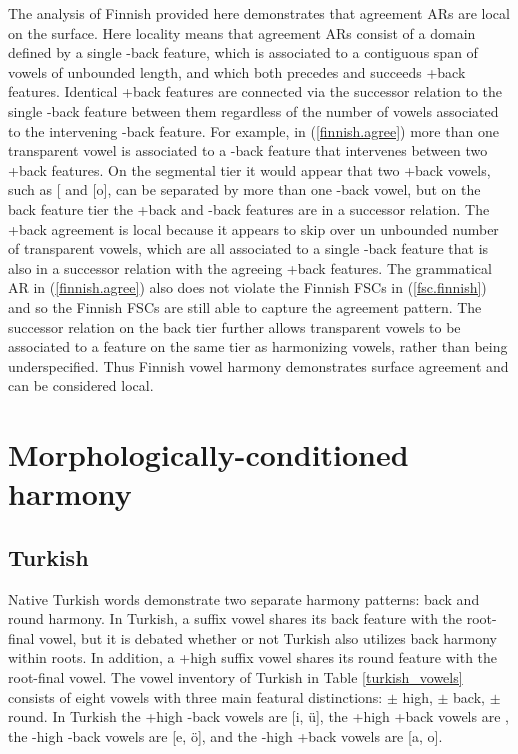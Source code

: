 \documentclass[,doc,floatsintext]{apa6}
\theoremstyle{definition}
\theoremstyle{definition}
\theoremstyle{definition}
\theoremstyle{remark}
\begin{document}
The analysis of Finnish provided here demonstrates that agreement ARs
are local on the surface. Here locality means that agreement ARs consist
of a domain defined by a single -back feature, which is associated to a
contiguous span of vowels of unbounded length, and which both precedes
and succeeds +back features. Identical +back features are connected via
the successor relation to the single -back feature between them
regardless of the number of vowels associated to the intervening -back
feature. For example, in (\ref{finnish.agree}) more than one transparent
vowel is associated to a -back feature that intervenes between two +back
features. On the segmental tier it would appear that two +back vowels,
such as {[}\textipa{A}{]} and {[}o{]}, can be separated by more than one
-back vowel, but on the back feature tier the +back and -back features
are in a successor relation. The +back agreement is local because it
appears to skip over un unbounded number of transparent vowels, which
are all associated to a single -back feature that is also in a successor
relation with the agreeing +back features. The grammatical AR in
(\ref{finnish.agree}) also does not violate the Finnish FSCs in
(\ref{fsc.finnish}) and so the Finnish FSCs are still able to capture
the agreement pattern. The successor relation on the back tier further
allows transparent vowels to be associated to a feature on the same tier
as harmonizing vowels, rather than being underspecified. Thus Finnish
vowel harmony demonstrates surface agreement and can be considered
local.

\section{Morphologically-conditioned
harmony}\label{morphologically-conditioned-harmony}

\subsection{Turkish}\label{turkish}

Native Turkish words demonstrate two separate harmony patterns: back and
round harmony. In Turkish, a suffix vowel shares its back feature with
the root-final vowel, but it is debated whether or not Turkish also
utilizes back harmony within roots. In addition, a +high suffix vowel
shares its round feature with the root-final vowel. The vowel inventory
of Turkish in Table \ref{turkish_vowels} consists of eight vowels with
three main featural distinctions: \(\pm\) high, \(\pm\) back, \(\pm\)
round. In Turkish the +high -back vowels are {[}i, ü{]}, the +high +back
vowels are \textipa{[1, u]}, the -high -back vowels are {[}e, ö{]}, and
the -high +back vowels are {[}a, o{]}.
\end{document}
